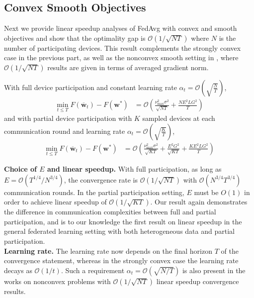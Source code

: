 \subsection{Convex Smooth Objectives}
Next we provide linear speedup analyses of FedAvg with convex and
smooth objectives and show that the optimality gap is $\mathcal{O}(1/\sqrt{NT})$
where $N$ is the number of participating devices. This result complements
the strongly convex case in the previous part, as well as the nonconvex
smooth setting in \cite{jiang2018linear,yu2019parallel,haddadpour2019convergence},
where $\mathcal{O}(1/\sqrt{NT})$ results are given in terms of averaged
gradient norm. 
\begin{theorem}
	\label{thm:SGD_cvx}With full device participation and constant learning
	rate $\alpha_{t}=\mathcal{O}(\sqrt{\frac{N}{T}})$, 
	\begin{align*}
	\min_{t\leq T}F(\overline{\mathbf{w}}_{t})-F(\mathbf{w}^{\ast}) & =\mathcal{O}\left(\frac{\nu_{\max}^{2}\sigma^{2}}{\sqrt{NT}}+\frac{NE^{2}LG^{2}}{T}\right)
	\end{align*}
	and with partial device participation with $K$ sampled devices at
	each communication round and learning rate $\alpha_{t}=\mathcal{O}(\sqrt{\frac{K}{T}})$,
	\begin{align*}
	\min_{t\leq T}F(\overline{\mathbf{w}}_{t})-F(\mathbf{w}^{\ast}) & =\mathcal{O}\left(\frac{\nu_{\max}^{2}\sigma^{2}}{\sqrt{KT}}+\frac{E^{2}G^{2}}{\sqrt{KT}}+\frac{KE^{2}LG^{2}}{T}\right)
	\end{align*}
\end{theorem}
%
\textbf{Choice of $E$ and linear speedup. }With full participation,
as long as $E=\mathcal{O}(T^{1/4}/N^{3/4})$, the convergence
rate is $\mathcal{O}(1/\sqrt{NT})$ with $\mathcal{O}(N^{3/4}T^{3/4})$
communication rounds. In the partial participation setting, $E$ must
be $O(1)$ in order to achieve linear speedup of $\mathcal{O}(1/\sqrt{KT})$.
Our result again demonstrates the difference in communication complexities
between full and partial participation, and is to our knowledge the
first result on linear speedup in the general federated learning setting
with both heterogeneous data and partial participation. \\
\textbf{Learning rate. }The learning rate now depends on the final
horizon $T$ of the convergence statement, whereas in the strongly
convex case the learning rate decays as $\mathcal{O}(1/t)$. Such
a requirement $\alpha_{t}=\mathcal{O}(\sqrt{N/T})$ is also present
in the works \cite{haddadpour2019convergence,yu2019parallel} on nonconvex
problems with $\mathcal{O}(1/\sqrt{NT})$ linear speedup convergence results. 